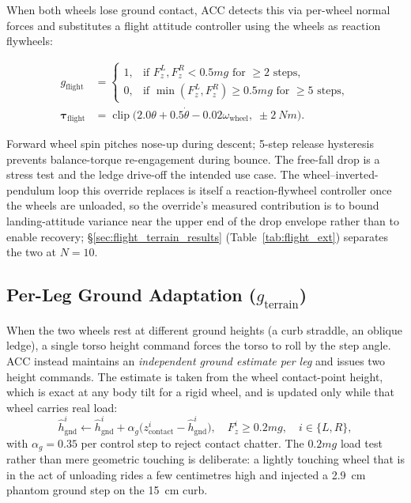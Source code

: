 \documentclass[conference]{IEEEtran}
\begin{document}
When both wheels lose ground contact, ACC detects this via per-wheel normal forces and substitutes a flight attitude controller using the wheels as reaction flywheels:

\begin{align}
g_{\text{flight}} &= \begin{cases}
1, & \text{if } F_z^L, F_z^R < 0.5mg \text{ for } {\geq} 2 \text{ steps},\\
0, & \text{if } \min(F_z^L,F_z^R) \geq 0.5mg \text{ for } {\geq} 5 \text{ steps},
\end{cases}\\[2pt]
\boldsymbol{\tau}_{\text{flight}} &= \operatorname{clip}\!\big(2.0\theta + 0.5\dot{\theta} - 0.02\omega_{\text{wheel}},\;\pm\SI{2}{Nm}\big).
\label{eq:flight}
\end{align}

Forward wheel spin pitches nose-up during descent; \num{5}-step release
hysteresis prevents balance-torque re-engagement during bounce. The free-fall
drop is a stress test and the ledge drive-off the intended use case. The
wheel--inverted-pendulum loop this override replaces is itself a
reaction-flywheel controller once the wheels are unloaded, so the override's
measured contribution is to bound landing-attitude variance near the upper end
of the drop envelope rather than to enable recovery; \S\ref{sec:flight_terrain_results}
(Table~\ref{tab:flight_ext}) separates the two at $N{=}10$.

\subsection{Per-Leg Ground Adaptation ($g_{\text{terrain}}$)}
\label{sec:terrain}

When the two wheels rest at different ground heights (a curb straddle, an oblique ledge), a single torso height command forces the torso to roll by the
step angle. ACC instead maintains an \emph{independent ground estimate per leg}
and issues two height commands. The estimate is taken from the wheel
contact-point height, which is exact at any body tilt for a rigid wheel, and is
updated only while that wheel carries real load:
\begin{equation}
\hat{h}_{\text{gnd}}^{i} \leftarrow \hat{h}_{\text{gnd}}^{i}
+ \alpha_g\big(z_{\text{contact}}^{i} - \hat{h}_{\text{gnd}}^{i}\big),
\quad F_z^{i} \geq 0.2mg, \quad i \in \{L,R\},
\label{eq:terrain_est}
\end{equation}
with $\alpha_g = 0.35$ per control step to reject contact chatter. The
$0.2mg$ load test rather than mere geometric touching is deliberate: a lightly
touching wheel that is in the act of unloading rides a few centimetres high and
injected a \SI{+2.9}{cm} phantom ground step on the \SI{15}{cm} curb.
\end{document}
